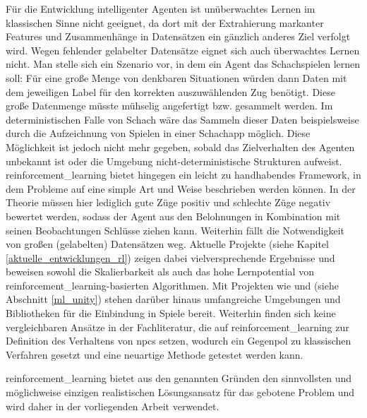 Für die Entwicklung intelligenter Agenten ist unüberwachtes Lernen im klassischen Sinne nicht geeignet, da dort mit der Extrahierung markanter Features und Zusammenhänge in Datensätzen ein gänzlich anderes Ziel verfolgt wird. Wegen fehlender gelabelter Datensätze eignet sich auch überwachtes Lernen nicht. Man stelle sich ein Szenario vor, in dem ein Agent das Schachspielen lernen soll: Für eine große Menge von denkbaren Situationen würden dann Daten mit dem jeweiligen Label für den korrekten auszuwählenden Zug benötigt. Diese große Datenmenge müsste mühselig angefertigt bzw. gesammelt werden. Im deterministischen Falle von Schach wäre das Sammeln dieser Daten beispielsweise durch die Aufzeichnung von Spielen in einer Schachapp möglich. Diese Möglichkeit ist jedoch nicht mehr gegeben, sobald das Zielverhalten des Agenten unbekannt ist oder die Umgebung nicht-deterministische Strukturen aufweist.
\ac{reinforcement_learning} bietet hingegen ein leicht zu handhabendes Framework, in dem Probleme auf eine simple Art und Weise beschrieben werden können. In der Theorie müssen hier lediglich gute Züge positiv und schlechte Züge negativ bewertet werden, sodass der Agent aus den Belohnungen in Kombination mit seinen Beobachtungen Schlüsse ziehen kann. Weiterhin fällt die Notwendigkeit von großen (gelabelten) Datensätzen weg.
Aktuelle Projekte (siehe Kapitel \ref{aktuelle_entwicklungen_rl}) zeigen dabei vielversprechende Ergebnisse und beweisen sowohl die Skalierbarkeit als auch das hohe Lernpotential von \ac{reinforcement_learning}-basierten Algorithmen. Mit Projekten wie  \cite{openai_gym} und  \cite{ml-agents_paper} (siehe Abschnitt \ref{ml_unity}) stehen darüber hinaus umfangreiche Umgebungen und Bibliotheken für die Einbindung in Spiele bereit. Weiterhin finden sich keine vergleichbaren Ansätze in der Fachliteratur, die auf \ac{reinforcement_learning} zur Definition des Verhaltens von \acp{npc} setzen, wodurch ein Gegenpol zu klassischen Verfahren gesetzt und eine neuartige Methode getestet werden kann.

\ac{reinforcement_learning} bietet aus den genannten Gründen den sinnvollsten und möglichweise einzigen realistischen Lösungsansatz für das gebotene Problem und wird daher in der vorliegenden Arbeit verwendet.




















